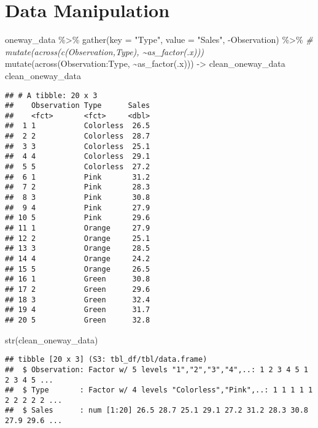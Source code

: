 \documentclass[
]{book}
\newenvironment{Shaded}{\begin{snugshade}}{\end{snugshade}}
\newcommand{\AttributeTok}[1]{\textcolor[rgb]{0.77,0.63,0.00}{#1}}
\newcommand{\CommentTok}[1]{\textcolor[rgb]{0.56,0.35,0.01}{\textit{#1}}}
\newcommand{\FunctionTok}[1]{\textcolor[rgb]{0.00,0.00,0.00}{#1}}
\newcommand{\NormalTok}[1]{#1}
\newcommand{\OtherTok}[1]{\textcolor[rgb]{0.56,0.35,0.01}{#1}}
\newcommand{\SpecialCharTok}[1]{\textcolor[rgb]{0.00,0.00,0.00}{#1}}
\newcommand{\StringTok}[1]{\textcolor[rgb]{0.31,0.60,0.02}{#1}}
\begin{document}
\hypertarget{data-manipulation}{%
\chapter{Data Manipulation}\label{data-manipulation}}

\begin{Shaded}
\begin{Highlighting}[]
\NormalTok{oneway\_data }\SpecialCharTok{\%\textgreater{}\%} 
  \FunctionTok{gather}\NormalTok{(}\AttributeTok{key =} \StringTok{"Type"}\NormalTok{, }\AttributeTok{value =} \StringTok{"Sales"}\NormalTok{, }\SpecialCharTok{{-}}\NormalTok{Observation) }\SpecialCharTok{\%\textgreater{}\%} 
  \CommentTok{\# mutate(across(c(Observation,Type), \textasciitilde{}as\_factor(.x)))}
  \FunctionTok{mutate}\NormalTok{(}\FunctionTok{across}\NormalTok{(Observation}\SpecialCharTok{:}\NormalTok{Type, }\SpecialCharTok{\textasciitilde{}}\FunctionTok{as\_factor}\NormalTok{(.x))) }\OtherTok{{-}\textgreater{}}\NormalTok{ clean\_oneway\_data}
\NormalTok{clean\_oneway\_data}
\end{Highlighting}
\end{Shaded}

\begin{verbatim}
## # A tibble: 20 x 3
##    Observation Type      Sales
##    <fct>       <fct>     <dbl>
##  1 1           Colorless  26.5
##  2 2           Colorless  28.7
##  3 3           Colorless  25.1
##  4 4           Colorless  29.1
##  5 5           Colorless  27.2
##  6 1           Pink       31.2
##  7 2           Pink       28.3
##  8 3           Pink       30.8
##  9 4           Pink       27.9
## 10 5           Pink       29.6
## 11 1           Orange     27.9
## 12 2           Orange     25.1
## 13 3           Orange     28.5
## 14 4           Orange     24.2
## 15 5           Orange     26.5
## 16 1           Green      30.8
## 17 2           Green      29.6
## 18 3           Green      32.4
## 19 4           Green      31.7
## 20 5           Green      32.8
\end{verbatim}

\begin{Shaded}
\begin{Highlighting}[]
\FunctionTok{str}\NormalTok{(clean\_oneway\_data)}
\end{Highlighting}
\end{Shaded}

\begin{verbatim}
## tibble [20 x 3] (S3: tbl_df/tbl/data.frame)
##  $ Observation: Factor w/ 5 levels "1","2","3","4",..: 1 2 3 4 5 1 2 3 4 5 ...
##  $ Type       : Factor w/ 4 levels "Colorless","Pink",..: 1 1 1 1 1 2 2 2 2 2 ...
##  $ Sales      : num [1:20] 26.5 28.7 25.1 29.1 27.2 31.2 28.3 30.8 27.9 29.6 ...
\end{verbatim}
\end{document}
